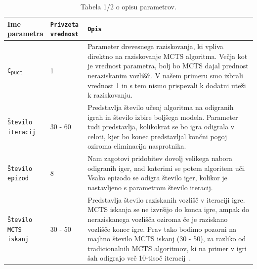 \documentclass[a4paper, 12pt]{book}
\begin{document}
\begin{table}
	\begin{center}
		\begin{tabular}{p{0.15\linewidth}|p{0.15\linewidth}|p{0.7\linewidth}}
			Ime parametra                             & {\tt Privzeta vrednost} & {\tt Opis} \\ \hline
			{\tt C\textsubscript{puct}}                               & 1 						& Parameter drevesnega raziskovanja, ki vpliva direktno na raziskovanje MCTS algoritma. 
																				  Večja kot je vrednost parametra, bolj bo MCTS dajal prednost neraziskanim vozlišči. V našem primeru smo izbrali vrednost 1 in s tem nismo prispevali k dodatni uteži k raziskovanju.\\
			{\tt Število iteracij}                    & 30 - 60					& Predstavlja število učenj algoritma na odigranih igrah in število izbire boljšega modela.
																				  Parameter tudi predstavlja, kolikokrat se bo igra odigrala v celoti, kjer bo konec predstavljal končni pogoj oziroma eliminacija nasprotnika.\\
			{\tt Število epizod}                      & 8 						& Nam zagotovi pridobitev dovolj velikega nabora odigranih iger, nad katerimi se potem algoritem uči.
																				  Vsako epizodo se odigra število iger, kolikor je nastavljeno s parametrom število iteracij.\\
			{\tt Število MCTS iskanj}                 & 30 - 50					& Predstavlja število raziskanih vozlišč v iteraciji igre. 
														 						  MCTS iskanja se ne izvršijo do konca igre, ampak do neraziskanega vozlišča oziroma če je raziskano vozlišče konec igre.
														 						  Prav tako bodimo pozorni na majhno število MCTS iskanj (30 - 50), za razliko od tradicionalnih MCTS algoritmov, ki na primer v igri šah odigrajo več 10-tisoč iteracij~\cite{kohne}.\\
		
		\end{tabular}
	\end{center}
	\caption{Tabela 1/2 o opisu parametrov.}
	\label{tableParameters1}
\end{table}
\end{document}
